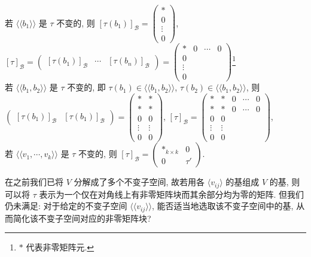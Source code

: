 \documentclass{note}
\begin{document}
\begin{eg}
    若 $\langle\langle b_1\rangle\rangle$ 是 $\tau$ 不变的, 则 $[\tau(b_1)]_{\mathcal{B}}=\begin{pmatrix}
        *\\
        0\\
        \vdots\\
        0
    \end{pmatrix}$, $[\tau]_{\mathcal{B}}=\begin{pmatrix}
        [\tau(b_1)]_{\mathcal{B}}&\cdots&[\tau(b_n)]_{\mathcal{B}}
    \end{pmatrix}=\begin{pmatrix}
        *&0&\cdots&0\\
        0\\
        \vdots\\
        0
    \end{pmatrix}$\footnote{$*$ 代表非零矩阵元.}\\
    若 $\langle\langle b_1,b_2\rangle\rangle$ 是 $\tau$ 不变的, 即 $\tau(b_1)\in\langle\langle b_1,b_2\rangle\rangle$, $\tau(b_2)\in\langle\langle b_1,b_2\rangle\rangle$, 则 $\begin{pmatrix}
        [\tau(b_1)]_{\mathcal{B}}&[\tau(b_1)]_{\mathcal{B}}
    \end{pmatrix}=\begin{pmatrix}
        *&*\\
        *&*\\
        0&0\\
        \vdots&\vdots\\
        0&0
    \end{pmatrix}$, $[\tau]_{\mathcal{B}}=\begin{pmatrix}
        *&*&0&\cdots&0\\
        *&*&0&\cdots&0\\
        0&0\\
        \vdots&\vdots\\
        0&0
    \end{pmatrix}$,\\
    若 $\langle\langle v_1,\cdots,v_k\rangle\rangle$ 是 $\tau$ 不变的, 则 $[\tau]_{\mathcal{B}}=\begin{pmatrix}
        *_{k\times k}&0\\
        0&\tau'
    \end{pmatrix}$.
\end{eg}

在之前我们已将 $V$ 分解成了多个不变子空间, 故若用各 $\langle v_{ij}\rangle$ 的基组成 $V$ 的基, 则可以将 $\tau$ 表示为一个仅在对角线上有非零矩阵块而其余部分均为零的矩阵. 但我们仍未满足: 对于给定的不变子空间 $\langle\langle v_{ij}\rangle\rangle$, 能否适当地选取该不变子空间中的基, 从而简化该不变子空间对应的非零矩阵块?
\end{document}
